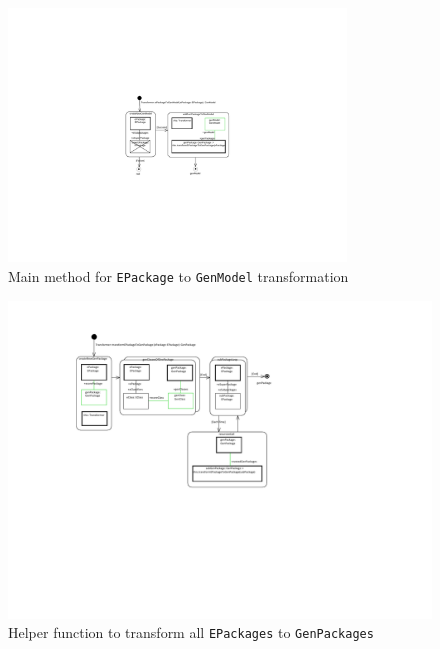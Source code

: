 \vspace{1cm}

\begin{figure}[htbp]
\begin{center}  \includegraphics[width=0.8\textwidth]{../../org.moflon.doc.handbook.05_miscellaneous/3_existingEMF/emfImages/SDMePackageToGenModel.pdf}
        \caption{Main method for \texttt{EPackage} to \texttt{GenModel} transformation}  
  \label{fig_pack2g}
\end{center}
\end{figure} 

\begin{figure}[htbp]
\begin{center}  
\includegraphics[width=1.1\textwidth]{../../org.moflon.doc.handbook.05_miscellaneous/3_existingEMF/emfImages/SDMtransformEpackageToGenPackage.pdf}
\caption{Helper function to transform all \texttt{EPackages} to \texttt{GenPackages}}  
\label{fig_transf}
\end{center}
\end{figure} 

